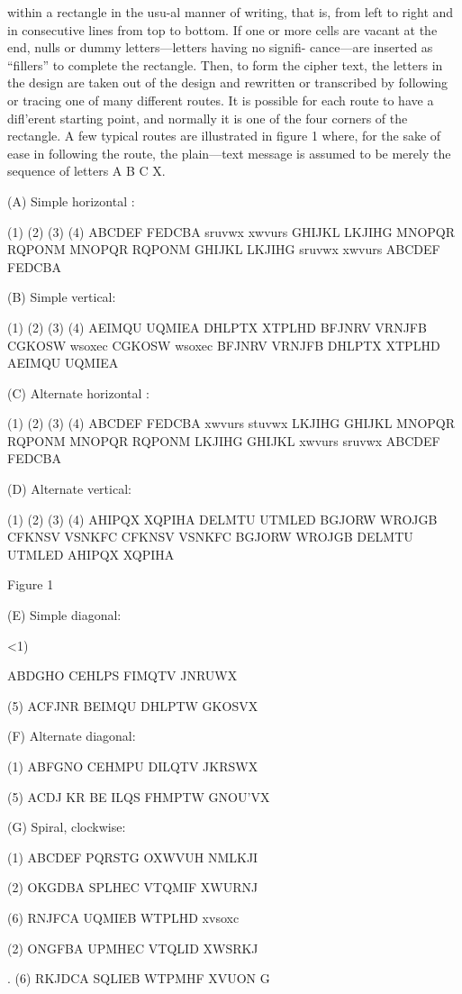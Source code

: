 within a rectangle in the usu-al manner of writing, that is, from left to
right and in consecutive lines from top to bottom. If one or more cells
are vacant at the end, nulls or dummy letters—letters having no signiﬁ-
cance—are inserted as “ﬁllers” to complete the rectangle. Then, to form
the cipher text, the letters in the design are taken out of the design and
rewritten or transcribed by following or tracing one of many different
routes. It is possible for each route to have a diﬂ’erent starting point, and
normally it is one of the four corners of the rectangle. A few typical
routes are illustrated in ﬁgure 1 where, for the sake of ease in following
the route, the plain—text message is assumed to be merely the sequence
of letters A B C X.

(A) Simple horizontal :

(1) (2) (3) (4)
ABCDEF FEDCBA sruvwx xwvurs
GHIJKL LKJIHG MNOPQR RQPONM
MNOPQR RQPONM GHIJKL LKJIHG
sruvwx xwvurs ABCDEF FEDCBA

(B) Simple vertical:

(1) (2) (3) (4)
AEIMQU UQMIEA DHLPTX XTPLHD
BFJNRV VRNJFB CGKOSW wsoxec
CGKOSW wsoxec BFJNRV VRNJFB
DHLPTX XTPLHD AEIMQU UQMIEA

(C) Alternate horizontal :

(1) (2) (3) (4)
ABCDEF FEDCBA xwvurs stuvwx
LKJIHG GHIJKL MNOPQR RQPONM
MNOPQR RQPONM LKJIHG GHIJKL
xwvurs sruvwx ABCDEF FEDCBA

(D) Alternate vertical:

(1) (2) (3) (4)
AHIPQX XQPIHA DELMTU UTMLED
BGJORW WROJGB CFKNSV VSNKFC
CFKNSV VSNKFC BGJORW WROJGB
DELMTU UTMLED AHIPQX XQPIHA

Figure 1


(E) Simple diagonal:

<1)

ABDGHO
CEHLPS
FIMQTV
JNRUWX

(5)
ACFJNR
BEIMQU
DHLPTW
GKOSVX

(F) Alternate diagonal:

(1)
ABFGNO
CEHMPU
DILQTV
JKRSWX

(5)
ACDJ KR
BE ILQS
FHMPTW
GNOU'VX

(G) Spiral, clockwise:

(1)
ABCDEF
PQRSTG
OXWVUH
NMLKJI

(2)
OKGDBA
SPLHEC
VTQMIF
XWURNJ

(6)
RNJFCA
UQMIEB
WTPLHD
xvsoxc

(2)
ONGFBA
UPMHEC
VTQLID
XWSRKJ

. (6)
RKJDCA
SQLIEB
WTPMHF
XVUON G

